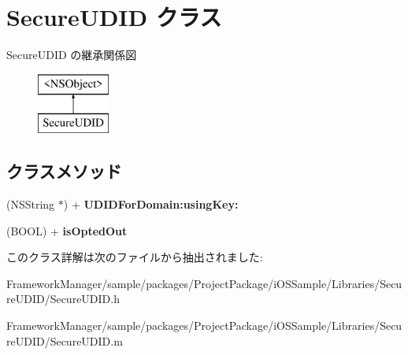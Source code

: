 \hypertarget{interface_secure_u_d_i_d}{}\section{Secure\+U\+D\+I\+D クラス}
\label{interface_secure_u_d_i_d}
Secure\+U\+D\+I\+D の継承関係図\begin{figure}[H]
\begin{center}
\leavevmode
\includegraphics[height=2.000000cm]{interface_secure_u_d_i_d}
\end{center}
\end{figure}
\subsection*{クラスメソッド}
\begin{DoxyCompactItemize}
\item 
\hypertarget{interface_secure_u_d_i_d_a28fc6258e8868d68f60f0f5fb5486500}{}(N\+S\+String $\ast$) + {\bfseries U\+D\+I\+D\+For\+Domain\+:using\+Key\+:}\label{interface_secure_u_d_i_d_a28fc6258e8868d68f60f0f5fb5486500}

\item 
\hypertarget{interface_secure_u_d_i_d_a9c84bb5edb550280409ce49a24531570}{}(B\+O\+O\+L) + {\bfseries is\+Opted\+Out}\label{interface_secure_u_d_i_d_a9c84bb5edb550280409ce49a24531570}

\end{DoxyCompactItemize}


このクラス詳解は次のファイルから抽出されました\+:\begin{DoxyCompactItemize}
\item 
Framework\+Manager/sample/packages/\+Project\+Package/i\+O\+S\+Sample/\+Libraries/\+Secure\+U\+D\+I\+D/Secure\+U\+D\+I\+D.\+h\item 
Framework\+Manager/sample/packages/\+Project\+Package/i\+O\+S\+Sample/\+Libraries/\+Secure\+U\+D\+I\+D/Secure\+U\+D\+I\+D.\+m\end{DoxyCompactItemize}
